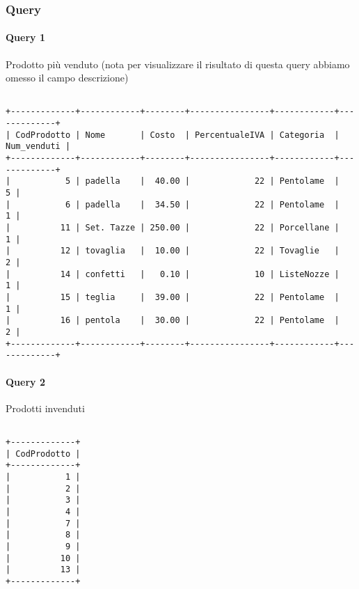 \newpage
\subsubsection{Query}

\paragraph*{Query 1}
Prodotto pi\`u venduto (nota per visualizzare il risultato di questa query abbiamo omesso il campo descrizione)

\begin{verbatim}

+-------------+------------+--------+----------------+------------+-------------+
| CodProdotto | Nome       | Costo  | PercentualeIVA | Categoria  | Num_venduti |
+-------------+------------+--------+----------------+------------+-------------+
|           5 | padella    |  40.00 |             22 | Pentolame  |           5 |
|           6 | padella    |  34.50 |             22 | Pentolame  |           1 |
|          11 | Set. Tazze | 250.00 |             22 | Porcellane |           1 |
|          12 | tovaglia   |  10.00 |             22 | Tovaglie   |           2 |
|          14 | confetti   |   0.10 |             10 | ListeNozze |           1 |
|          15 | teglia     |  39.00 |             22 | Pentolame  |           1 |
|          16 | pentola    |  30.00 |             22 | Pentolame  |           2 |
+-------------+------------+--------+----------------+------------+-------------+

\end{verbatim}




\paragraph*{Query 2}
Prodotti invenduti

\begin{verbatim}

+-------------+
| CodProdotto |
+-------------+
|           1 |
|           2 |
|           3 |
|           4 |
|           7 |
|           8 |
|           9 |
|          10 |
|          13 |
+-------------+

\end{verbatim}



